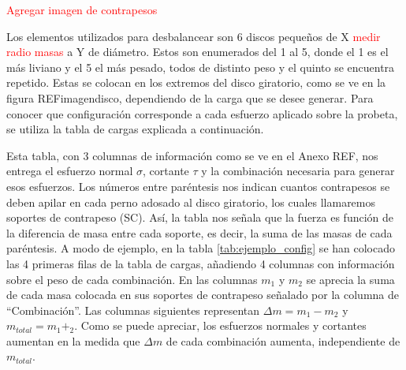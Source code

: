 \textcolor{red}{Agregar imagen de contrapesos}

Los elementos utilizados para desbalancear son 6 discos pequeños de X \textcolor{red}{medir radio masas} a Y de diámetro. Estos son enumerados del 1 al 5, donde el 1 es el más liviano y el 5 el más pesado, todos de distinto peso y el quinto se encuentra repetido. Estas se colocan en los extremos del disco giratorio, como se ve en la figura REFimagendisco, dependiendo de la carga que se desee generar. Para conocer que configuración corresponde a cada esfuerzo aplicado sobre la probeta, se utiliza la tabla de cargas explicada a continuación.

Esta tabla, con 3 columnas de información como se ve en el Anexo REF, nos entrega el esfuerzo normal $\sigma$, cortante $\tau$ y la combinación necesaria para generar esos esfuerzos. Los números entre paréntesis nos indican cuantos contrapesos se deben apilar en cada perno adosado al disco giratorio, los cuales llamaremos soportes de contrapeso (SC). Así, la tabla nos señala que la fuerza es función de la diferencia de masa entre cada soporte, es decir, la suma de las masas de cada paréntesis. A modo de ejemplo, en la tabla \ref{tab:ejemplo_config} se han colocado las 4 primeras filas de la tabla de cargas, añadiendo 4 columnas con información sobre el peso de cada combinación. En las columnas $m_1$ y $m_2$ se aprecia la suma de cada masa colocada en sus soportes de contrapeso señalado por la columna de ``Combinación''. Las columnas siguientes representan $\Delta m = m_1-m_2$ y $m_{total}=m_1+_2$. Como se puede apreciar, los esfuerzos normales y cortantes aumentan en la medida que $\Delta m$ de cada combinación aumenta, independiente de $m_{total}$.


